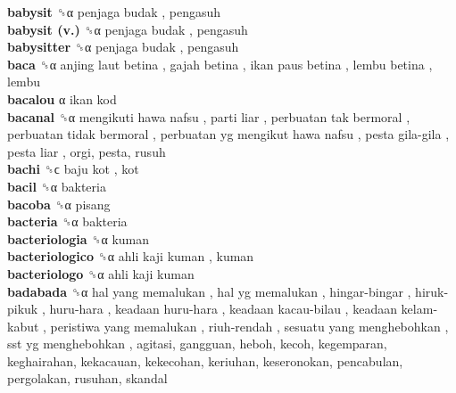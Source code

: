 \textbf{babysit} ␝α   penjaga budak , pengasuh  \\
\textbf{babysit (v.)} ␝α   penjaga budak , pengasuh  \\
\textbf{babysitter} ␝α   penjaga budak , pengasuh  \\
\textbf{baca} ␝α   anjing laut betina ,  gajah betina ,  ikan paus betina ,  lembu betina , lembu  \\
\textbf{bacalou} α   ikan kod   \\
\textbf{bacanal} ␝α   mengikuti hawa nafsu ,  parti liar ,  perbuatan tak bermoral ,  perbuatan tidak bermoral ,  perbuatan yg mengikut hawa nafsu ,  pesta gila-gila ,  pesta liar , orgi, pesta, rusuh  \\
\textbf{bachi} ␝ϲ   baju kot , kot  \\
\textbf{bacil} ␝α  bakteria  \\
\textbf{bacoba} ␝α  pisang  \\
\textbf{bacteria} ␝α  bakteria  \\
\textbf{bacteriologia} ␝α  kuman  \\
\textbf{bacteriologico} ␝α   ahli kaji kuman , kuman  \\
\textbf{bacteriologo} ␝α   ahli kaji kuman   \\
\textbf{badabada} ␝α   hal yang memalukan ,  hal yg memalukan ,  hingar-bingar ,  hiruk-pikuk ,  huru-hara ,  keadaan huru-hara ,  keadaan kacau-bilau ,  keadaan kelam-kabut ,  peristiwa yang memalukan ,  riuh-rendah ,  sesuatu yang menghebohkan ,  sst yg menghebohkan , agitasi, gangguan, heboh, kecoh, kegemparan, keghairahan, kekacauan, kekecohan, keriuhan, keseronokan, pencabulan, pergolakan, rusuhan, skandal  \\
